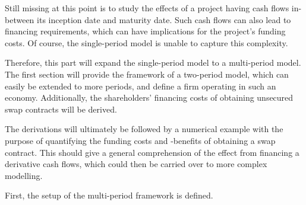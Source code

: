 \documentclass[main.tex]{subfiles}
\begin{document}
    Still missing at this point is to study the effects of a project
    having cash flows in-between its inception date and maturity date.
    Such cash flows can also lead to financing requirements,
    which can have implications for the project's funding costs.
    Of course, the single-period model is unable to capture this complexity.

    Therefore, this part will expand the single-period model to a multi-period model.
    The first section will provide the framework of a two-period model, 
    which can easily be extended to more periods,
    and define a firm operating in such an economy.
    Additionally, the shareholders' financing costs 
    of obtaining unsecured swap contracts will be derived.

    The derivations will ultimately be followed by a numerical example
    with the purpose of quantifying the funding costs and -benefits of obtaining a swap contract.
    This should give a general comprehension of the effect from financing a derivative cash flows,
    which could then be carried over to more complex modelling.

    First, the setup of the multi-period framework is defined.
\end{document}
